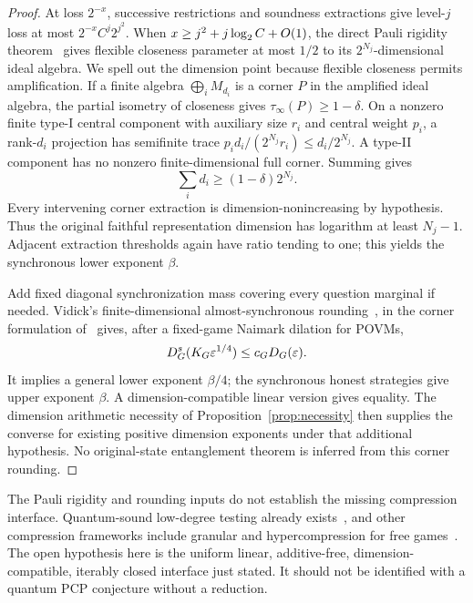 \begin{proof}
At loss $2^{-x}$, successive restrictions and soundness extractions give level-$j$ loss at most $2^{-x}C^j2^{j^2}$. When $x\ge j^2+j\log_2 C+O(1)$, the direct Pauli rigidity theorem~\cite[Theorem 3.11]{Salle} gives flexible closeness parameter at most $1/2$ to its $2^{N_j}$-dimensional ideal algebra. We spell out the dimension point because flexible closeness permits amplification. If a finite algebra $\bigoplus_iM_{d_i}$ is a corner $P$ in the amplified ideal algebra, the partial isometry of closeness gives $\tau_\infty(P)\ge1-\delta$. On a nonzero finite type-I central component with auxiliary size $r_i$ and central weight $p_i$, a rank-$d_i$ projection has semifinite trace $p_id_i/(2^{N_j}r_i)\le d_i/2^{N_j}$. A type-II component has no nonzero finite-dimensional full corner. Summing gives
\[
 \sum_i d_i\ge(1-\delta)2^{N_j}.
\]
Every intervening corner extraction is dimension-nonincreasing by hypothesis. Thus the original faithful representation dimension has logarithm at least $N_j-1$. Adjacent extraction thresholds again have ratio tending to one; this yields the synchronous lower exponent $\beta$.

Add fixed diagonal synchronization mass covering every question marginal if needed. Vidick's finite-dimensional almost-synchronous rounding~\cite{Vidick}, in the corner formulation of~\cite[Corollaries 3.2 and 3.4]{MS} gives, after a fixed-game Naimark dilation for POVMs,
\[
 D_G^s(K_G\varepsilon^{1/4})\le c_GD_G(\varepsilon).
\]
It implies a general lower exponent $\beta/4$; the synchronous honest strategies give upper exponent $\beta$. A dimension-compatible linear version gives equality. The dimension arithmetic necessity of Proposition~\ref{prop:necessity} then supplies the converse for existing positive dimension exponents under that additional hypothesis. No original-state entanglement theorem is inferred from this corner rounding.
\end{proof}

The Pauli rigidity and rounding inputs do not establish the missing compression interface. Quantum-sound low-degree testing already exists~\cite{LowDegree}, and other compression frameworks include granular and hypercompression for free games~\cite{NZ}. The open hypothesis here is the uniform linear, additive-free, dimension-compatible, iterably closed interface just stated. It should not be identified with a quantum PCP conjecture without a reduction.
